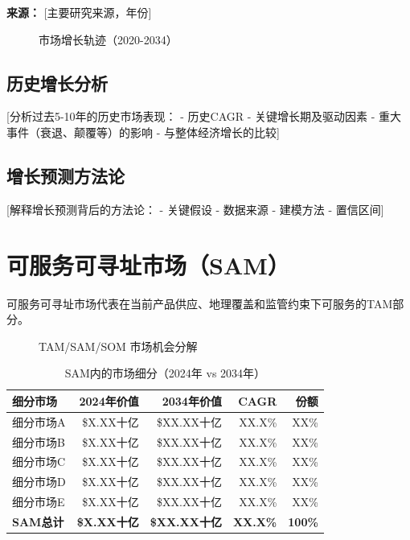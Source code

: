 \documentclass[11pt,letterpaper]{report}
\begin{document}
{\textbf{来源：} [主要研究来源，年份]

\begin{figure}[htbp]
\centering
\caption{市场增长轨迹（2020-2034）}
\label{fig:market_growth}
\end{figure}

\subsection{历史增长分析}

[分析过去5-10年的历史市场表现：
- 历史CAGR
- 关键增长期及驱动因素
- 重大事件（衰退、颠覆等）的影响
- 与整体经济增长的比较]

\subsection{增长预测方法论}

[解释增长预测背后的方法论：
- 关键假设
- 数据来源
- 建模方法
- 置信区间]

\section{可服务可寻址市场（SAM）}

可服务可寻址市场代表在当前产品供应、地理覆盖和监管约束下可服务的TAM部分。


\begin{figure}[htbp]
\centering
\caption{TAM/SAM/SOM 市场机会分解}
\label{fig:tam_sam_som}
\end{figure}

\begin{table}[htbp]
\centering
\caption{SAM内的市场细分（2024年 vs 2034年）}
\begin{tabular}{@{}lrrrr@{}}
\toprule
\textbf{细分市场} & \textbf{2024年价值} & \textbf{2034年价值} & \textbf{CAGR} & \textbf{份额} \\
\midrule
细分市场A & \$X.XX十亿 & \$XX.XX十亿 & XX.X\% & XX\% \\
\rowcolor{tablealt} 细分市场B & \$X.XX十亿 & \$XX.XX十亿 & XX.X\% & XX\% \\
细分市场C & \$X.XX十亿 & \$XX.XX十亿 & XX.X\% & XX\% \\
\rowcolor{tablealt} 细分市场D & \$X.XX十亿 & \$XX.XX十亿 & XX.X\% & XX\% \\
细分市场E & \$X.XX十亿 & \$XX.XX十亿 & XX.X\% & XX\% \\
\midrule
\textbf{SAM总计} & \textbf{\$X.XX十亿} & \textbf{\$XX.XX十亿} & \textbf{XX.X\%} & \textbf{100\%} \\
\bottomrule
\end{tabular}
\label{tab:sam_segments}
\end{table}

}
\end{document}
